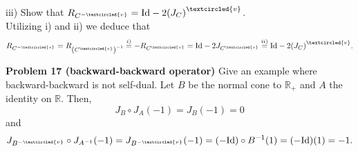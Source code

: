 \documentclass{scrartcl}
\newcommand{\R}{\mathbb{R}}
\theoremstyle{plain}
\theoremstyle{remark}
\newcommand{\Id}{\textup{Id}}
\newcommand{\ov}{\textcircled{v}}
\begin{document}
iii) Show that $R_{C^{-\ov}} = \Id - 2{(J_{C})}^{\ov}$.\\
Utilizing i) and ii) we deduce that
\begin{equation}
  R_{C^{-\ov}} = R_{\left(C^{\ov}\right)^{-1}} \overset{i)}{=} - R_{C^{\ov}} = \Id - 2 J_{C^{\ov}} \overset{ii)}{=} \Id - 2 {(J_{C})}^{\ov}.
\end{equation}



\textbf{Problem 17 (backward-backward operator)} Give an example where backward-backward is not self-dual.
Let $B$ be the normal cone to $\R_{+}$ and $A$ the identity on $\R$.
Then, 
\begin{equation}
  J_{B} \circ J_{A} (-1) = J_{B} (-1) = 0
\end{equation}
and
\begin{equation}
  J_{B^{-\ov}} \circ J_{A^{-1}} (-1) = J_{B^{-\ov}} (-1) = (-\Id) \circ B^{-1} (1) = (-\Id) (1) = -1.
\end{equation}
\end{document}
